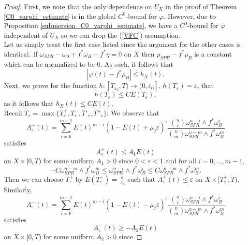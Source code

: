 \documentclass[12pt]{article}
\numberwithin{equation}{section}
\newcommand{\e}{\varepsilon}
\begin{document}
\begin{proof}
First, we note that the only dependence on $U_X$ in the proof of Theorem \ref{C0_varphi_estimate} is in the global $C^0$-bound for $\varphi$. However, due to Proposition \ref{submersion_C0_varphi_estimate}, we have a $C^0$-bound for $\varphi$ independent of $U_X$ so we can drop the (\ref{VFC}) assumption.\\
Let us simply treat the first case listed since the argument for the other cases is identical. If $\omega_{SPR} - \omega_0 + f^*\omega_B - f^*\eta = 0$ on $X$ then $\rho_{SPR}-f^*\rho_B$ is a constant which can be normalized to be $0$. As such, it follows that
\begin{equation*}
    |\varphi(t) - f^*\rho_B| \leq h_X(t).
\end{equation*}
Next, we prove for the function $h: [T_{\e_0},T) \to (0,\e_0]$, $h(T_\e) = \e$, that
\begin{equation*}
    h(T_{\e}) \leq CE(T_{\e}),
\end{equation*}
as it follows that $h_X(t) \leq CE(t)$.\\
Recall $T_{\e} = \max\{T^+_{\e},T^-_{\e}, T'_{\e},T''_{\e}\}$. We observe that
\begin{equation*}
    A_{\e}^{+}(t) = \sum_{i=0}^{m-1} E(t)^{m-i}(1-E(t)+\mu_j\e)^i \frac{{n\choose i}\omega_{SPR}^{n-i} \wedge f^* \omega_B^i}{{n\choose m} \omega_{SPR}^{n-m} \wedge f^*\omega_B^m}
\end{equation*}
satisfies 
\begin{equation*}
    A^+_{\e}(t) \leq A_1 E(t)
\end{equation*}
on $X \times [0,T)$ for some uniform $A_1 > 0$ since $0 < \e < 1$ and for all $i = 0, \dots, m-1$,
\begin{equation*}
    -C \omega_{SPR}^{n-m} \wedge f^*\omega_B^m \leq \omega_{SPR}^{n-i} \wedge f^*\omega_B^i \leq C \omega_{SPR}^{n-m} \wedge f^*\omega_B^m.
\end{equation*}
Then we can choose $T^+_{\e}$ by $E(T^+_{\e}) = \frac{\e}{A_1}$ such that $A^+_{\e}(t) \leq \e$ on $X \times [T_{\e}^+,T)$. Similarly,
\begin{equation*}
    A_{\e}^{-}(t) = \sum_{i=0}^{m-1} E(t)^{m-i}(1-E(t)-\mu_j\e)^i \frac{{n\choose i}\omega_{SPR}^{n-i} \wedge f^* \omega_B^i}{{n\choose m} \omega_{SPR}^{n-m} \wedge f^*\omega_B^m}
\end{equation*}
satisfies
\begin{equation*}
    A_{\e}^-(t) \geq -A_2 E(t)
\end{equation*}
on $X \times [0,T)$ for some uniform $A_2 > 0$ since

\end{proof}
\end{document}
